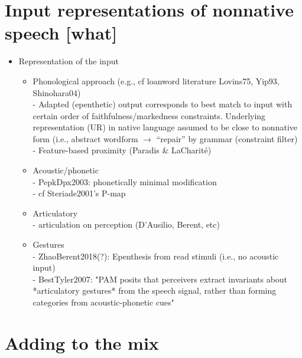 \section{Input representations of nonnative speech [what]}

\begin{itemize}
\item Representation of the input
  \begin{itemize}
  \item Phonological approach (e.g., cf loanword literature Lovins75, Yip93, Shinohara04) \\
    - Adapted (epenthetic) output corresponds to best match to input with certain order of faithfulness/markedness constraints. Underlying representation (UR) in native language assumed to be close to nonnative form (i.e., abstract wordform $\rightarrow$ ``repair'' by grammar (constraint filter)
    - Feature-based proximity (Paradis \& LaCharité)

  \item Acoustic/phonetic \\
    - PepkDpx2003: phonetically minimal modification \\
    - cf Steriade2001's P-map
  \item Articulatory \\
    - articulation on perception (D'Ausilio, Berent, etc)
  \item Gestures \\
    - ZhaoBerent2018(?): Epenthesis from read stimuli (i.e., no acoustic input) \\
    - BestTyler2007: "PAM posits that perceivers extract invariants about *articulatory gestures* from the speech signal, rather than forming categories from acoustic-phonetic cues"
  \end{itemize}
\end{itemize}

\section{Adding to the mix}  
 
